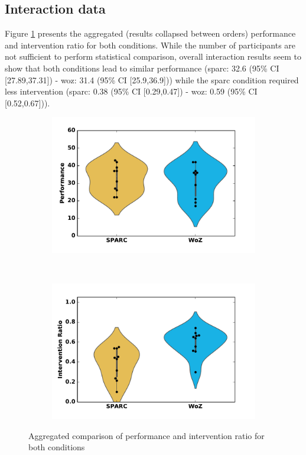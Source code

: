 \subsection{Interaction data}

Figure \ref{fig:woz_comp} presents the aggregated (results collapsed between orders) performance and intervention ratio for both conditions. While the number of participants are not sufficient to perform statistical comparison, overall interaction results seem to show that both conditions lead to similar performance (\gls{sparc}: 32.6 (95\% CI [27.89,37.31]) - \gls{woz}: 31.4 (95\% CI [25.9,36.9])) while the \gls{sparc} condition required less intervention (\gls{sparc}: 0.38 (95\% CI [0.29,0.47]) - \gls{woz}: 0.59 (95\% CI [0.52,0.67])). 

\begin{figure}[ht]
	\centering
	\begin{subfigure}[t]{0.5\textwidth}
		\centering
		\includegraphics[width=1.0\textwidth]{perf.pdf}
	\end{subfigure}%
	~ 
	\begin{subfigure}[t]{0.5\textwidth}
		\centering
		\includegraphics[width=1.0\textwidth]{ratio.pdf}
	\end{subfigure}
	\caption{Aggregated comparison of performance and intervention ratio for both conditions}
	\label{fig:woz_comp}
\end{figure}

